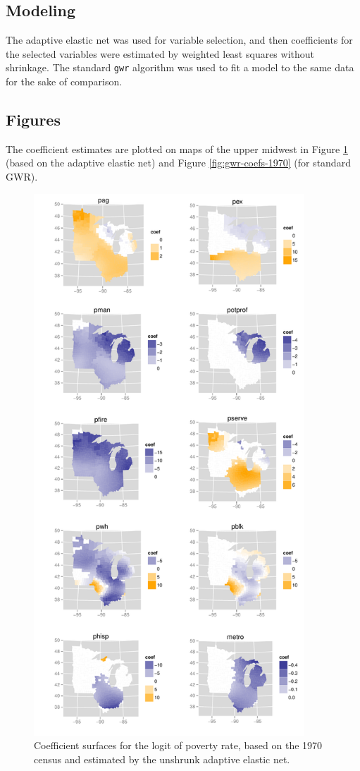 \documentclass[authoryear, review, 11pt]{elsarticle}
\begin{document}
	\subsection{Modeling}	
	The adaptive elastic net was used for variable selection, and then coefficients for the selected variables were estimated by weighted least squares without shrinkage. The standard \verb!gwr! algorithm was used to fit a model to the same data for the sake of comparison.
	
	\subsection{Figures}
	The coefficient estimates are plotted on maps of the upper midwest in Figure \ref{fig:unshrunk-enet-coefs-1970} (based on the adaptive elastic net) and Figure \ref{fig:gwr-coefs-1970} (for standard GWR).
	\begin{figure}
		\begin{center}
			\includegraphics[height=8in]{../../figures/poverty/1970-linear-coefficients-unshrunk.pdf}
			\caption{Coefficient surfaces for the logit of poverty rate, based on the 1970 census and estimated by the unshrunk adaptive elastic net. \label{fig:unshrunk-enet-coefs-1970}}
		\end{center}
	\end{figure}	
	
\end{document}
